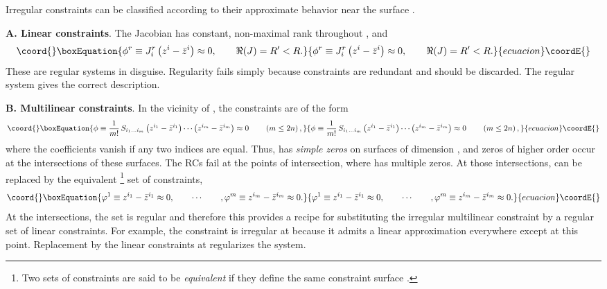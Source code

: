 \documentclass[a4paper,thmsa,11pt]{article}
\begin{document}
Irregular constraints can be classified according to their approximate
behavior near the surface \myHighlight{$\Sigma $}\coordHE{}.

\textbf{A. Linear constraints}. The Jacobian has constant, non-maximal rank
throughout \myHighlight{$\Sigma $}\coordHE{}, and
\begin{equation}\coord{}\boxEquation{
\phi ^{r}\equiv J_{i}^{r}\left( z^{i}-\bar{z}^{i}\right) \approx 0,\qquad
\Re (J)=R^{\prime }<R.
}{
\phi ^{r}\equiv J_{i}^{r}\left( z^{i}-\bar{z}^{i}\right) \approx 0,\qquad
\Re (J)=R^{\prime }<R.
}{ecuacion}\coordE{}\end{equation}
These are regular systems in disguise. Regularity fails simply because \coordHE{} constraints are redundant and should be discarded. The
regular system gives the correct description.

\textbf{B. Multilinear constraints}. In the vicinity of \myHighlight{$\Sigma $}\coordHE{}, the
constraints are of the form
\begin{equation}\coord{}\boxEquation{
\phi \equiv \frac{1}{m!}\,S_{i_{1}\ldots i_{m}}\left( z^{i_{1}}-\bar{z}
^{i_{1}}\right) \cdots \left( z^{i_{m}}-\bar{z}^{i_{m}}\right) \approx
0\qquad \left( m\leq 2n\right) ,
}{
\phi \equiv \frac{1}{m!}\,S_{i_{1}\ldots i_{m}}\left( z^{i_{1}}-\bar{z}
^{i_{1}}\right) \cdots \left( z^{i_{m}}-\bar{z}^{i_{m}}\right) \approx
0\qquad \left( m\leq 2n\right) ,
}{ecuacion}\coordE{}\end{equation}
where the coefficients \coordHE{} vanish if any two indices are
equal. Thus, \myHighlight{$\phi $}\coordHE{} has \emph{simple zeros} on surfaces of dimension \coordHE{}%
, and zeros of higher order occur at the intersections of these surfaces.
The RCs fail at the points of intersection, where \myHighlight{$\phi $}\coordHE{} has multiple
zeros. At those intersections, \myHighlight{$\phi $}\coordHE{} can be replaced by the equivalent%
\footnote{%
Two sets of constraints are said to be \emph{equivalent} if they define the
same constraint surface \myHighlight{$\Sigma $}\coordHE{}.} set of constraints,
\begin{equation}\coord{}\boxEquation{
\varphi ^{1}\equiv z^{i_{1}}-\bar{z}^{i_{1}}\approx 0,\qquad \cdots \qquad ,
\varphi ^{m}\equiv z^{i_{m}}-\bar{z}^{i_{m}}\approx 0.
}{
\varphi ^{1}\equiv z^{i_{1}}-\bar{z}^{i_{1}}\approx 0,\qquad \cdots \qquad ,
\varphi ^{m}\equiv z^{i_{m}}-\bar{z}^{i_{m}}\approx 0.
}{ecuacion}\coordE{}\end{equation}
At the intersections, the set \coordHE{} is regular and therefore this provides a recipe for substituting the
irregular multilinear constraint \myHighlight{$\phi $}\coordHE{} by a regular set of linear
constraints. For example, the constraint \coordHE{} is
irregular at \coordHE{} because it admits a linear approximation everywhere
except at this point. Replacement \myHighlight{$\phi $}\coordHE{} by the linear constraints \coordHE{} at \coordHE{} regularizes the system.
\end{document}
